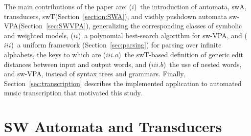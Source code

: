 \documentclass[runningheads]{llncs}
\def\SWT{\textsf{swT}\xspace}
\def\SWA{\textsf{swA}\xspace}
\def\SWVPA{\textsf{sw-VPA}\xspace}
\begin{document}

The main contributions of the paper are: 
($i$)~the introduction of automata, \SWA, transducers, \SWT (Section~\ref{section:SWA}),
and visibly pushdown automata \SWVPA (Section~\ref{sec:SWVPA}),
generalizing the corresponding classes of symbolic and weighted models, 
($ii$)~a polynomial best-search algorithm for \SWVPA, %
and ($iii$)~a uniform framework (Section~\ref{sec:parsing}) for parsing over infinite alphabets, 
the keys to which are 
($iii.a$)~the \SWT-based definition of generic edit distances between input and output words,
and ($iii.b$)~the use of nested words, and \SWVPA, 
instead of syntax trees and grammars. %
%
Finally, Section~\ref{sec:transcription} describes
the implemented application %
to automated music transcription
that motivated this study.








\section{SW Automata and Transducers}
\label{section:transducer}\label{sec:transducer}
\label{section:SWA}\label{sec:SWA}
\label{section:SWT}\label{sec:SWT}
\end{document}
